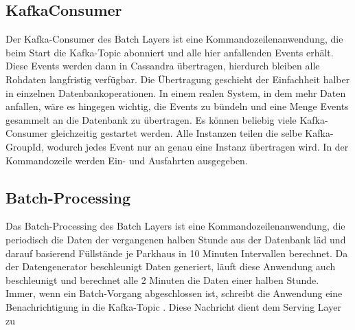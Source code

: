 \subsection{KafkaConsumer}
Der Kafka-Consumer des Batch Layers ist eine Kommandozeilenanwendung, die beim Start die Kafka-Topic  abonniert und alle hier anfallenden Events erhält.
Diese Events werden dann in Cassandra übertragen, hierdurch bleiben alle Rohdaten langfristig verfügbar.
Die Übertragung geschieht der Einfachheit halber in einzelnen Datenbankoperationen.
In einem realen System, in dem mehr Daten anfallen, wäre es hingegen wichtig, die Events zu bündeln und eine Menge Events gesammelt an die Datenbank zu übertragen.
Es können beliebig viele Kafka-Consumer gleichzeitig gestartet werden.
Alle Instanzen teilen die selbe Kafka-GroupId, wodurch jedes Event nur an genau eine Instanz übertragen wird.
In der Kommandozeile werden Ein- und Ausfahrten ausgegeben.

\subsection{Batch-Processing}
Das Batch-Processing des Batch Layers ist eine Kommandozeilenanwendung, die periodisch die Daten der vergangenen halben Stunde aus der Datenbank läd und darauf basierend Füllstände je Parkhaus in 10 Minuten Intervallen berechnet.
Da der Datengenerator beschleunigt Daten generiert, läuft diese Anwendung auch beschleunigt und berechnet alle 2 Minuten die Daten einer halben Stunde.
Immer, wenn ein Batch-Vorgang abgeschlossen ist, schreibt die Anwendung eine Benachrichtigung in die Kafka-Topic .
Diese Nachricht dient dem Serving Layer zu



